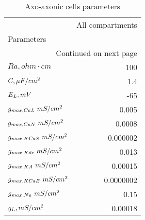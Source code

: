 \begin{longtable}{lr}
\caption{Axo-axonic cells parameters}\label{ca1_aac_cell_parameters}\\
\toprule
{} &      All compartments \\
Parameters      &           \\
\midrule
\endhead
\midrule
\multicolumn{2}{r}{{Continued on next page}} \\
\midrule
\endfoot

\bottomrule
\endlastfoot
$Ra,
 ohm \cdot cm$              &       100 \\
$C, \linebreak \mu F / cm^2$              &       1.4 \\
$E_L, \linebreak mV$       &       -65 \\
$g_{max, CaL    }\linebreak \  mS / cm^2$&     0.005 \\
$g_{max, CaN    }\linebreak \  mS / cm^2$&    0.0008 \\
$g_{max, KCaS    }\linebreak \  mS / cm^2$&  0.000002 \\
$g_{max, Kdr }\linebreak \  mS / cm^2$&     0.013 \\
$g_{max, KA     }\linebreak \  mS / cm^2$&   0.00015 \\
$g_{max, KCaB   }\linebreak \  mS / cm^2$& 0.0000002 \\
$g_{max, Na     }\linebreak \  mS / cm^2$&      0.15 \\
$g_L, \linebreak mS / cm^2$    &   0.00018 \\
\end{longtable}
